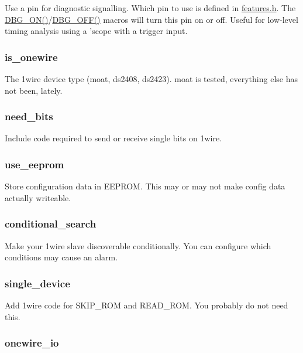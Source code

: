 Use a pin for diagnostic signalling. Which pin to use is defined in {\ttfamily \hyperlink{features_8h}{features.\-h}}. The {\ttfamily \hyperlink{onewire_8c_a93e505e4e4e1119ed32afcb615b385f6}{D\-B\-G\-\_\-\-O\-N()}}/{\ttfamily \hyperlink{onewire_8c_ac037b21720571ebb0110174b826ccaac}{D\-B\-G\-\_\-\-O\-F\-F()}} macros will turn this pin on or off. Useful for low-\/level timing analysis using a 'scope with a trigger input.

\subsubsection*{{\ttfamily is\-\_\-onewire}}

The 1wire device type (moat, ds2408, ds2423). {\ttfamily moat} is tested, everything else has not been, lately.

\subsubsection*{{\ttfamily need\-\_\-bits}}

Include code required to send or receive single bits on 1wire.

\subsubsection*{{\ttfamily use\-\_\-eeprom}}

Store configuration data in E\-E\-P\-R\-O\-M. This may or may not make config data actually writeable.

\subsubsection*{{\ttfamily conditional\-\_\-search}}

Make your 1wire slave discoverable conditionally. You can configure which conditions may cause an alarm.

\subsubsection*{{\ttfamily single\-\_\-device}}

Add 1wire code for {\ttfamily S\-K\-I\-P\-\_\-\-R\-O\-M} and {\ttfamily R\-E\-A\-D\-\_\-\-R\-O\-M}. You probably do not need this.

\subsubsection*{{\ttfamily onewire\-\_\-io}}

